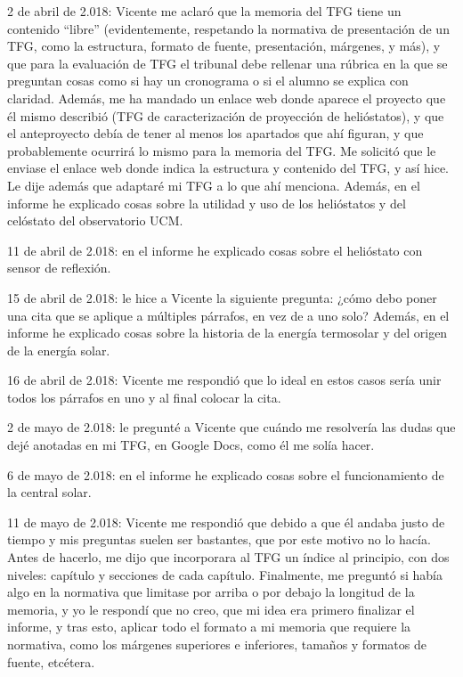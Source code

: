 \documentclass[12pt]{article}
\begin{document}
2 de abril de 2.018: Vicente me aclaró que la memoria del TFG tiene un contenido “libre” (evidentemente, respetando la normativa de presentación de un TFG, como la estructura, formato de fuente, presentación, márgenes, y más), y que para la evaluación de TFG el tribunal debe rellenar una rúbrica en la que se preguntan cosas como si hay un cronograma o si el alumno se explica con claridad. Además, me ha mandado un enlace web donde aparece el proyecto que él mismo describió (TFG de caracterización de proyección de helióstatos), y que el anteproyecto debía de tener al menos los apartados que ahí figuran, y que probablemente ocurrirá lo mismo para la memoria del TFG. Me solicitó que le enviase el enlace web donde indica la estructura y contenido del TFG, y así hice. Le dije además que adaptaré mi TFG a lo que ahí menciona. Además, en el informe he explicado cosas sobre la utilidad y uso de los helióstatos y del celóstato del observatorio UCM.

11 de abril de 2.018: en el informe he explicado cosas sobre el helióstato con sensor de reflexión.

15 de abril de 2.018: le hice a Vicente la siguiente pregunta: ¿cómo debo poner una cita que se aplique a múltiples párrafos, en vez de a uno solo? Además, en el informe he explicado cosas sobre la historia de la energía termosolar y del origen de la energía solar.

16 de abril de 2.018: Vicente me respondió que lo ideal en estos casos sería unir todos los párrafos en uno y al final colocar la cita.

2 de mayo de 2.018: le pregunté a Vicente que cuándo me resolvería las dudas que dejé anotadas en mi TFG, en Google Docs, como él me solía hacer.

6 de mayo de 2.018: en el informe he explicado cosas sobre el funcionamiento de la central solar.

11 de mayo de 2.018: Vicente me respondió que debido a que él andaba justo de tiempo y mis preguntas suelen ser bastantes, que por este motivo no lo hacía. Antes de hacerlo, me dijo que incorporara al TFG un índice al principio, con dos niveles: capítulo y secciones de cada capítulo. Finalmente, me preguntó si había algo en la normativa que limitase por arriba o por debajo la longitud de la memoria, y yo le respondí que no creo, que mi idea era primero finalizar el informe, y tras esto, aplicar todo el formato a mi memoria que requiere la normativa, como los márgenes superiores e inferiores, tamaños y formatos de fuente, etcétera.
\end{document}
